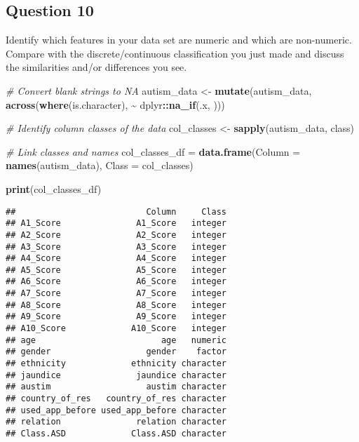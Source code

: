\documentclass[
]{article}
\newenvironment{Shaded}{\begin{snugshade}}{\end{snugshade}}
\newcommand{\AttributeTok}[1]{\textcolor[rgb]{0.13,0.29,0.53}{#1}}
\newcommand{\CommentTok}[1]{\textcolor[rgb]{0.56,0.35,0.01}{\textit{#1}}}
\newcommand{\FunctionTok}[1]{\textcolor[rgb]{0.13,0.29,0.53}{\textbf{#1}}}
\newcommand{\NormalTok}[1]{#1}
\newcommand{\OtherTok}[1]{\textcolor[rgb]{0.56,0.35,0.01}{#1}}
\newcommand{\SpecialCharTok}[1]{\textcolor[rgb]{0.81,0.36,0.00}{\textbf{#1}}}
\newcommand{\StringTok}[1]{\textcolor[rgb]{0.31,0.60,0.02}{#1}}
\begin{document}
\subsection{Question 10}\label{question-10}

Identify which features in your data set are numeric and which are
non-numeric. Compare with the discrete/continuous classification you
just made and discuss the similarities and/or differences you see.

\begin{Shaded}
\begin{Highlighting}[]
\CommentTok{\# Convert blank strings to NA}
\NormalTok{autism\_data }\OtherTok{\textless{}{-}} \FunctionTok{mutate}\NormalTok{(autism\_data, }\FunctionTok{across}\NormalTok{(}\FunctionTok{where}\NormalTok{(is.character), }\SpecialCharTok{\textasciitilde{}}\NormalTok{ dplyr}\SpecialCharTok{::}\FunctionTok{na\_if}\NormalTok{(.x, }\StringTok{\textquotesingle{}\textquotesingle{}}\NormalTok{)))}

\CommentTok{\# Identify column classes of the data}
\NormalTok{col\_classes }\OtherTok{\textless{}{-}} \FunctionTok{sapply}\NormalTok{(autism\_data, class)}

\CommentTok{\# Link classes and names}
\NormalTok{col\_classes\_df }\OtherTok{=} \FunctionTok{data.frame}\NormalTok{(}\AttributeTok{Column =} \FunctionTok{names}\NormalTok{(autism\_data), }\AttributeTok{Class =}\NormalTok{ col\_classes)}

\FunctionTok{print}\NormalTok{(col\_classes\_df)}
\end{Highlighting}
\end{Shaded}

\begin{verbatim}
##                          Column     Class
## A1_Score               A1_Score   integer
## A2_Score               A2_Score   integer
## A3_Score               A3_Score   integer
## A4_Score               A4_Score   integer
## A5_Score               A5_Score   integer
## A6_Score               A6_Score   integer
## A7_Score               A7_Score   integer
## A8_Score               A8_Score   integer
## A9_Score               A9_Score   integer
## A10_Score             A10_Score   integer
## age                         age   numeric
## gender                   gender    factor
## ethnicity             ethnicity character
## jaundice               jaundice character
## austim                   austim character
## country_of_res   country_of_res character
## used_app_before used_app_before character
## relation               relation character
## Class.ASD             Class.ASD character
\end{verbatim}
\end{document}
